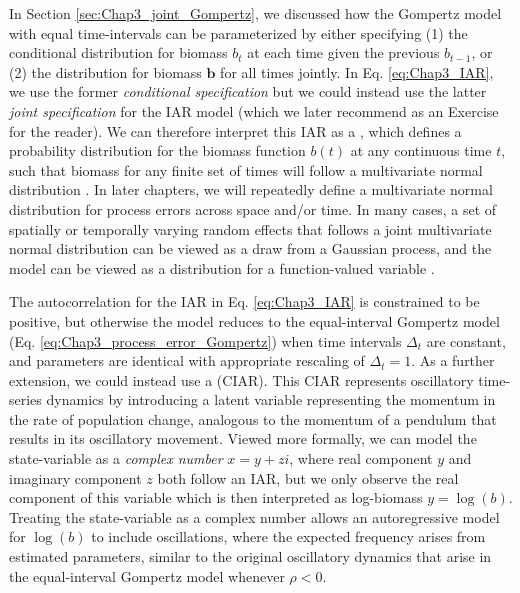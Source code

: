 In Section \ref{sec:Chap3_joint_Gompertz}, we discussed how the Gompertz model with equal time-intervals can be parameterized by either specifying (1) the conditional distribution for biomass \(b_t\) at each time given the previous \(b_{t-1}\), or (2) the distribution for biomass \(\mathbf{b}\) for all times jointly.  In Eq. \ref{eq:Chap3_IAR}, we use the former \textit{conditional specification} but we could instead use the latter \textit{joint specification} for the IAR model (which we later recommend as an Exercise for the reader).  We can therefore interpret this IAR as a , which defines a probability distribution for the biomass function \(b(t)\) at any continuous time \(t\), such that biomass for any finite set of times will follow a multivariate normal distribution \cite{rasmussen_gaussian_2006}.  In later chapters, we will repeatedly define a multivariate normal distribution for process errors across space and/or time.  In many cases, a set of spatially or temporally varying random effects that follows a joint multivariate normal distribution can be viewed as a draw from a Gaussian process, and the model can be viewed as a distribution for a function-valued variable \cite{thorson_using_2017}.

The autocorrelation for the IAR in Eq. \ref{eq:Chap3_IAR} is constrained to be positive, but otherwise the model reduces to the equal-interval Gompertz model (Eq. \ref{eq:Chap3_process_error_Gompertz}) when time intervals \(\Delta_t\) are constant, and parameters are identical with appropriate rescaling of \( \Delta_t=1 \).  As a further extension, we could instead use a  (CIAR).  This CIAR \cite{elorrieta_discrete-time_2019} represents oscillatory time-series dynamics by introducing a latent variable representing the momentum in the rate of population change, analogous to the momentum of a pendulum that results in its oscillatory movement.  Viewed more formally, we can model the state-variable as a \textit{complex number} \( x = y + zi \), where real component \(y\) and imaginary component \(z\) both follow an IAR, but we only observe the real component of this variable which is then interpreted as log-biomass \(y = \log(b)\).  Treating the state-variable as a complex number allows an autoregressive model for \(\log(b)\) to include oscillations, where the expected frequency arises from estimated parameters, similar to the original oscillatory dynamics that arise in the equal-interval Gompertz model whenever \(\rho < 0\).

